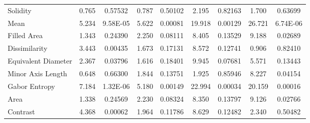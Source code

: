 \documentclass[twocolumn]{article}
\begin{document}
\begin{table}[ht!]
{\begin{tabular}{lcccccccc}
        Solidity & 0.765 & 0.57532 & 0.787 & 0.50102 & 2.195 & 0.82163 & 1.700 & 0.63699 \\ 
        Mean & 5.234 & 9.58E-05 & 5.622 & 0.00081 & 19.918 & 0.00129 & 26.721 & 6.74E-06 \\ 
        Filled Area & 1.343 & 0.24390 & 2.250 & 0.08111 & 8.405 & 0.13529 & 9.188 & 0.02689 \\ 
        Dissimilarity & 3.443 & 0.00435 & 1.673 & 0.17131 & 8.572 & 0.12741 & 0.906 & 0.82410 \\ 
        Equivalent Diameter & 2.367 & 0.03796 & 1.616 & 0.18401 & 9.945 & 0.07681 & 5.571 & 0.13443 \\ 
        Minor Axis Length & 0.648 & 0.66300 & 1.844 & 0.13751 & 1.925 & 0.85946 & 8.227 & 0.04154 \\ 
        Gabor Entropy & 7.184 & 1.32E-06 & 5.180 & 0.00149 & 22.994 & 0.00034 & 20.159 & 0.00016 \\ 
        Area & 1.338 & 0.24569 & 2.230 & 0.08324 & 8.350 & 0.13797 & 9.126 & 0.02766 \\ 
        Contrast & 4.368 & 0.00062 & 1.964 & 0.11786 & 8.629 & 0.12482 & 2.340 & 0.50482 \\ 
        \hline
    \end{tabular}%
    }
\end{table}
\end{document}
